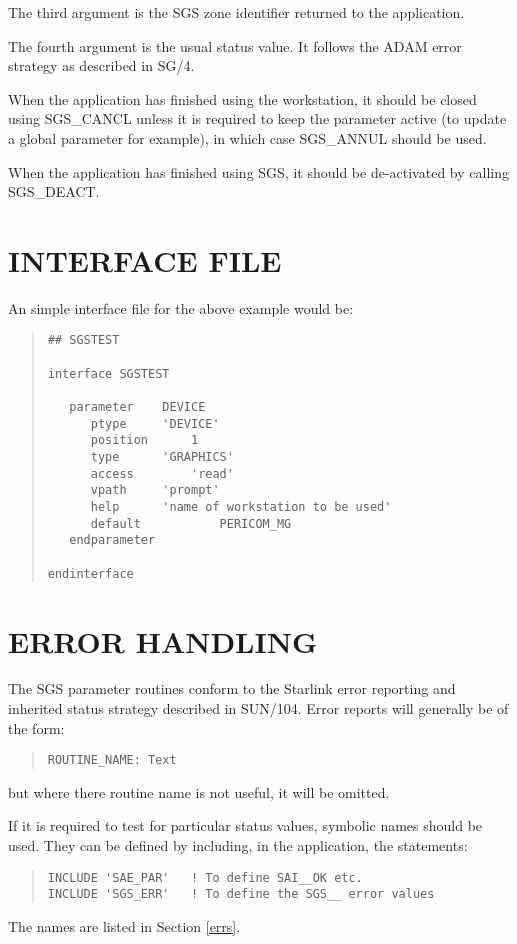 The third argument is the SGS zone identifier returned to the application.

The fourth argument is the usual status value. It follows the ADAM error
strategy as described in SG/4.

When the application has finished using the workstation, it should be closed
using SGS\_CANCL unless it is required to keep the parameter active 
(to update a global parameter for example), in which case SGS\_ANNUL 
should be used.

When the application has finished using SGS, it should be de-activated by
calling SGS_DEACT.

\section{INTERFACE FILE}
An simple interface file for the above example would be:
\begin{quote}
\begin{verbatim}
## SGSTEST

interface SGSTEST

   parameter	DEVICE
      ptype		'DEVICE'
      position		1
      type		'GRAPHICS'
      access		'read'
      vpath		'prompt'
      help		'name of workstation to be used'
      default           PERICOM_MG
   endparameter

endinterface
\end{verbatim}
\end{quote}

\section{ERROR HANDLING}
The SGS parameter routines conform to the Starlink error reporting and
inherited status strategy described in SUN/104.
Error reports will generally be of the form:
\begin{quote}
\begin{verbatim}
ROUTINE_NAME: Text
\end{verbatim}
\end{quote}
but where there routine name is not useful, it will be omitted.

If it is required to test for particular status values, symbolic names should
be used. 
They can be defined by including, in the application,  the statements:
\begin{quote}
\begin{verbatim}
INCLUDE 'SAE_PAR'   ! To define SAI__OK etc.
INCLUDE 'SGS_ERR'   ! To define the SGS__ error values
\end{verbatim}
\end{quote}
The names are listed in Section \ref{errs}.


